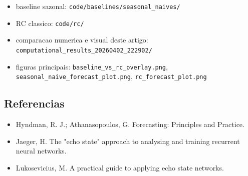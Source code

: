\documentclass[12pt]{article}
\providecommand{\tightlist}{%
          \setlength{\itemsep}{0pt}\setlength{\parskip}{0pt}}
\begin{document}
\begin{itemize}
\tightlist
\item
  baseline sazonal: \texttt{code/baselines/seasonal\_naives/}
\item
  RC classico: \texttt{code/rc/}
\item
  comparacao numerica e visual deste artigo: \texttt{computational\_results\_20260402\_222902/}
\item
  figuras principais: \texttt{baseline\_vs\_rc\_overlay.png}, \texttt{seasonal\_naive\_forecast\_plot.png}, \texttt{rc\_forecast\_plot.png}
\end{itemize}

\subsection{Referencias}\label{referencias}

\begin{itemize}
\tightlist
\item
  Hyndman, R. J.; Athanasopoulos, G. Forecasting: Principles and Practice.
\item
  Jaeger, H. The "echo state" approach to analysing and training recurrent neural networks.
\item
  Lukosevicius, M. A practical guide to applying echo state networks.
\end{itemize}

        
\end{document}
